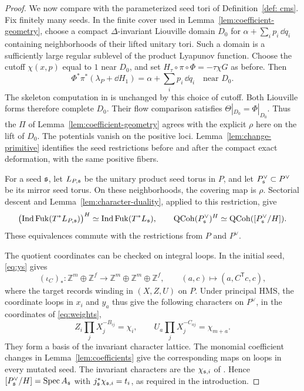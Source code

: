 \documentclass[12pt, letter]{amsart}
\theoremstyle{definition}
\newcommand{\Z}{\mathbb Z}
\DeclareMathOperator{\Ind}{Ind}
\numberwithin{equation}{section}
\begin{document}
\begin{proof}
We now compare with the parameterized seed tori of
Definition~\ref{def: cms}.  
Fix finitely many seeds. In the finite cover used in
Lemma~\ref{lem:coefficient-geometry}, choose a compact
$\Delta$-invariant Liouville domain $D_0$ for
$\alpha+\sum_i p_i\,\dd q_i$ containing neighborhoods of their lifted
unitary tori. Such a domain is a sufficiently large regular sublevel
of the product Lyapunov function.
Choose the cutoff $\chi(x,p)$ equal to $1$ near $D_0$, and set
$H_\tau\circ\pi\circ\Phi=-\tau\chi G$ as before. Then
\[
 \Phi^*\pi^*(\lambda_P+\dd H_1)
   =\alpha+\sum_i p_i\,\dd q_i
 \quad\text{near }D_0.
\]
The skeleton computation in \cite[proof of Lemma~4.15]{HS} is unchanged
by this choice of cutoff. Both Liouville forms therefore complete
$D_0$. Their flow comparison satisfies $\Theta|_{D_0}=\Phi|_{D_0}$.  Thus the $\Pi$ of 
Lemma~\ref{lem:coefficient-geometry} agrees with the explicit $\rho$ here on the lift of $D_0$.
The potentials vanish on the positive loci.
Lemma~\ref{lem:change-primitive} identifies the seed restrictions before
and after the compact exact deformation, with the same positive fibers.

For a seed $\mathfrak{s}$, let $L_{P,\mathfrak{s}}$ be the unitary product seed torus in $P$,
and let $P_{\mathfrak{s}}^\vee\subset P^\vee$ be its mirror seed torus.
On these neighborhoods, the covering map is $\rho$.
Sectorial descent and Lemma~\ref{lem:character-duality}, applied to
this restriction, give
\[
 \bigl(\Ind\Fuk(T^*L_{P,\fs})\bigr)^H
 \simeq\Ind\Fuk(T^*L_{\fs}),\qquad
 \QCoh(P_{\fs}^\vee)^H\simeq\QCoh([P_{\fs}^\vee/H]).
\]
These equivalences commute with the restrictions from $P$ and $P^\vee$.

The quotient coordinates can be checked on integral loops.
In the initial seed, \eqref{eq:ys} gives
\[
 (\iota_C)_*:\Z^m\oplus\Z^f\longrightarrow
       \Z^m\oplus\Z^m\oplus\Z^f,\qquad
 (a,c)\longmapsto(a,C^{\mathsf T}c,c),
\]
where the target records winding in $(X,Z,U)$ on $P$.
Under principal HMS, the coordinate loops in $x_i$ and $y_a$ thus give
the following characters on $P^\vee$, in the coordinates of
\eqref{eq:weights},
\[
 Z_i\prod_jX_j^{-B_{ij}}=\chi_i,\qquad
 U_a\prod_jX_j^{-C_{aj}}=\chi_{m+a}.
\]
They form a basis of the invariant character lattice.
The monomial coefficient changes in Lemma~\ref{lem:coefficients}
give the corresponding maps on loops in every mutated seed.
The invariant characters are the $\chi_{\mathfrak{s},i}$ of
\cite[Section~3.6, equations~(25) and~(28)]{HS}.
Hence $[P_{\mathfrak{s}}^\vee/H]=\operatorname{Spec} A_{\mathfrak{s}}$ with
$j_{\mathfrak{s}}^*\chi_{\mathfrak{s},i}=t_i$, as required in the introduction.


\end{proof}
\end{document}
